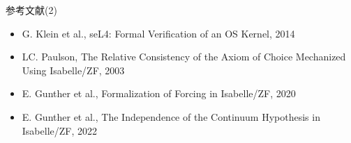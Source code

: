 \documentclass[17pt]{beamer}
\begin{document}
\begin{frame}{参考文献(2)}
    \vspace{-30pt}
    \, {\footnotesize 
    \begin{itemize}[itemsep=5pt, left=0pt]
        \item G. Klein et al., seL4: Formal Verification of an OS Kernel, 2014
        \item LC. Paulson, The Relative Consistency of the Axiom of Choice Mechanized Using Isabelle/ZF, 2003
        \item E. Gunther et al., Formalization of Forcing in Isabelle/ZF, 2020
        \item E. Gunther et al., The Independence of the Continuum Hypothesis in Isabelle/ZF, 2022
    \end{itemize}
    }

\end{frame}

\end{document}
